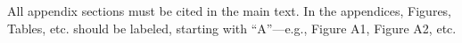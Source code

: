 \documentclass[journal,article,submit,moreauthors,pdftex]{Definitions/mdpi}
\begin{document}
\begin{paracol}{2}
    \section{}
    All appendix sections must be cited in the main text. In the appendices, Figures, Tables, etc. should be labeled, starting with ``A''---e.g., Figure A1, Figure A2, etc. 
    
\end{paracol}
\end{document}
